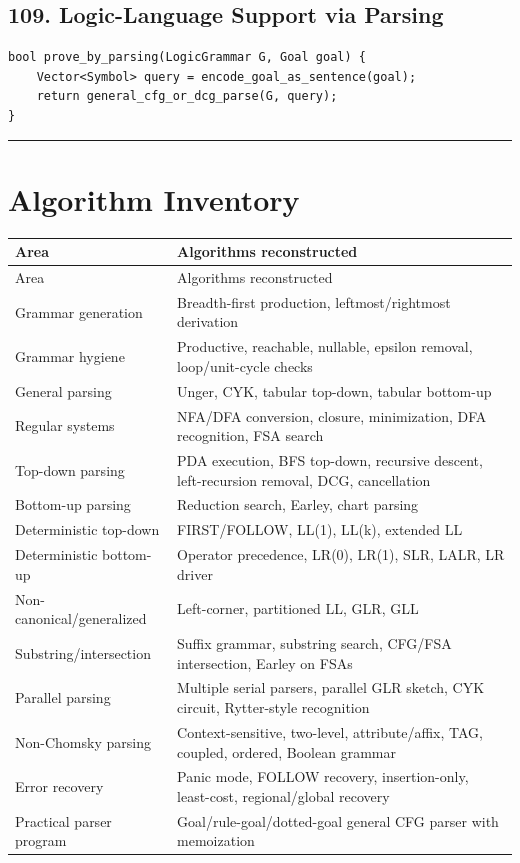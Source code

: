 \documentclass[10pt,letterpaper]{article}
\begin{document}
\subsection*{109. Logic-Language Support via Parsing}

\begin{verbatim}
bool prove_by_parsing(LogicGrammar G, Goal goal) {
    Vector<Symbol> query = encode_goal_as_sentence(goal);
    return general_cfg_or_dcg_parse(G, query);
}
\end{verbatim}

\medskip\hrule\medskip

\clearpage
\section*{Algorithm Inventory}

\begin{longtable}{L{0.28\textwidth}L{0.65\textwidth}}
\toprule
Area & Algorithms reconstructed \\
\midrule\endfirsthead
\toprule
Area & Algorithms reconstructed \\
\midrule\endhead
Grammar generation & Breadth-first production, leftmost/rightmost derivation \\
Grammar hygiene & Productive, reachable, nullable, epsilon removal, loop/unit-cycle checks \\
General parsing & Unger, CYK, tabular top-down, tabular bottom-up \\
Regular systems & NFA/DFA conversion, closure, minimization, DFA recognition, FSA search \\
Top-down parsing & PDA execution, BFS top-down, recursive descent, left-recursion removal, DCG, cancellation \\
Bottom-up parsing & Reduction search, Earley, chart parsing \\
Deterministic top-down & FIRST/FOLLOW, LL(1), LL(k), extended LL \\
Deterministic bottom-up & Operator precedence, LR(0), LR(1), SLR, LALR, LR driver \\
Non-canonical/generalized & Left-corner, partitioned LL, GLR, GLL \\
Substring/intersection & Suffix grammar, substring search, CFG/FSA intersection, Earley on FSAs \\
Parallel parsing & Multiple serial parsers, parallel GLR sketch, CYK circuit, Rytter-style recognition \\
Non-Chomsky parsing & Context-sensitive, two-level, attribute/affix, TAG, coupled, ordered, Boolean grammar \\
Error recovery & Panic mode, FOLLOW recovery, insertion-only, least-cost, regional/global recovery \\
Practical parser program & Goal/rule-goal/dotted-goal general CFG parser with memoization \\
\bottomrule
\end{longtable}
\end{document}
